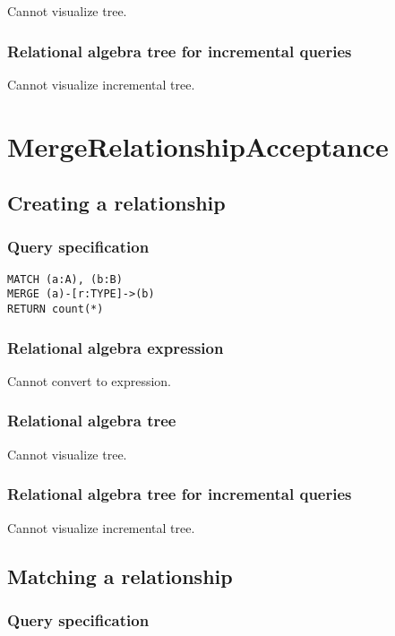 Cannot visualize tree.

\subsubsection*{Relational algebra tree for incremental queries}

Cannot visualize incremental tree.

\section{MergeRelationshipAcceptance}

\subsection{Creating a relationship}

\subsubsection*{Query specification}

\begin{lstlisting}
MATCH (a:A), (b:B)
MERGE (a)-[r:TYPE]->(b)
RETURN count(*)
\end{lstlisting}

\subsubsection*{Relational algebra expression}

Cannot convert to expression.

\subsubsection*{Relational algebra tree}

Cannot visualize tree.

\subsubsection*{Relational algebra tree for incremental queries}

Cannot visualize incremental tree.

\subsection{Matching a relationship}

\subsubsection*{Query specification}

